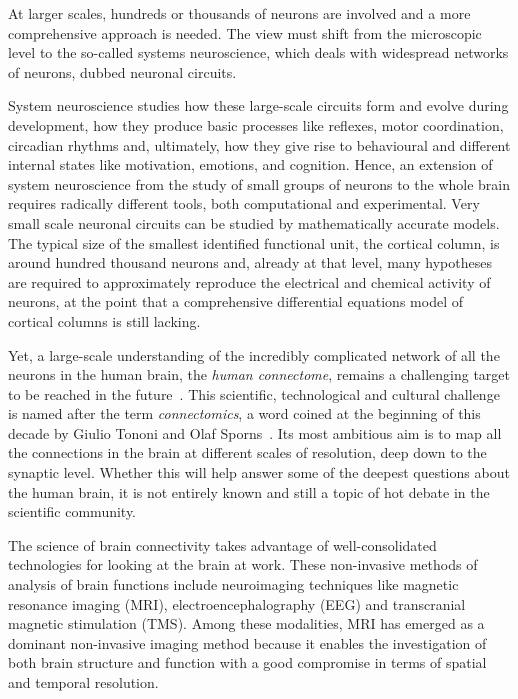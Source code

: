 \documentclass[11pt,              a4paper,              twoside,openright,              titlepage,              headinclude,footinclude,                            numbers=noenddot,              cleardoublepage=empty,]{scrreprt}
\begin{document}
At larger scales, hundreds or thousands of neurons are involved and a more comprehensive approach is needed.
The view must shift from the microscopic level to the so-called systems neuroscience, which deals with widespread networks of neurons, dubbed neuronal circuits.

System neuroscience studies how these large-scale circuits form and evolve during  development, how they produce basic processes like reflexes, motor coordination, circadian rhythms and, ultimately, how they give rise to behavioural and different internal states like motivation, emotions, and cognition.
Hence, an extension of system neuroscience from the study of small groups of neurons to the whole brain requires radically different tools, both computational and experimental.
Very small scale neuronal circuits can be studied by mathematically accurate models.
The typical size of the smallest identified functional unit, the cortical column, is around hundred thousand neurons and, already at that level, many hypotheses are required to approximately reproduce the electrical and chemical activity of neurons, at the point that a comprehensive differential equations model of cortical columns is still lacking.

Yet, a large-scale understanding of the incredibly complicated network of all the neurons in the human brain, the \emph{human connectome}, remains a challenging target to be reached in the future~\cite{amunts2016}.
This scientific, technological and cultural challenge is named after the term \emph{connectomics}, a word coined at the beginning of this decade by Giulio Tononi and Olaf Sporns~\cite{sporns2005}.
Its most ambitious aim is to map all the connections in the brain at different scales of resolution, deep down to the synaptic level.
Whether this will help answer some of the deepest questions about the human brain, it is not entirely known and still a topic of hot debate in the scientific community.

The science of brain connectivity takes advantage of well-consolidated technologies for looking at the brain at work.
These non-invasive methods of analysis of brain functions include neuroimaging techniques like magnetic resonance imaging (MRI), electroencephalography (EEG) and transcranial magnetic stimulation (TMS).
Among these modalities, MRI has emerged as a dominant non-invasive imaging method because it enables the investigation of both brain structure and function with a good compromise in terms of spatial and temporal resolution.
\end{document}
